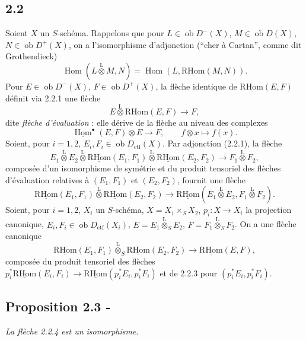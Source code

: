 \documentclass[11pt]{article}
\DeclareMathOperator{\Hom}{Hom}
\newcommand{\R}{\mathrm{R}}\newcommand{\RHomCore}{\mathrm{RHom}}
\newcommand{\ob}{\operatorname{ob}}
\providecommand{\RHom}{\RHomCore}
\providecommand{\uRHom}{\underline{\RHom}}
\providecommand{\ctf}{\mathrm{ctf}}
\providecommand{\RHom}{\RHomCore}
\providecommand{\Hom}{\operatorname{Hom}}
\providecommand{\ob}{\operatorname{ob}}
\providecommand{\RHom}{\R\mathcal{H}om}
\providecommand{\R}{\mathrm R}
\providecommand{\RHom}{\RHomCore}
\providecommand{\Hom}{\operatorname{Hom}}
\begin{document}
\subsection*{2.2}
Soient $X$ un $S$-schéma. Rappelons que pour $L\in\ob D^{-}(X)$, $M\in\ob D(X)$, $N\in\ob D^{+}(X)$, on a l'isomorphisme d'adjonction (``cher à Cartan'', comme dit Grothendieck)
\begin{equation}\tag{2.2.1}
\Hom(L\overset{\mathrm{L}}{\otimes}M,N)=\Hom(L,\uRHom(M,N)).
\end{equation}
Pour $E\in\ob D^{-}(X)$, $F\in\ob D^{+}(X)$, la flèche identique de $\uRHom(E,F)$ définit via 2.2.1 une flèche
\begin{equation}\tag{2.2.2}
E\overset{\mathrm{L}}{\otimes}\uRHom(E,F)\longrightarrow F,
\end{equation}
dite \emph{flèche d'évaluation} : elle dérive de la flèche au niveau des complexes
\[
\underline{\Hom}^{\bullet}(E,F)\otimes E\longrightarrow F,
\qquad f\otimes x\longmapsto f(x).
\]
Soient, pour $i=1,2$, $E_i,F_i\in\ob D_{\ctf}(X)$. Par adjonction (2.2.1), la flèche
\[
E_1\overset{\mathrm{L}}{\otimes}E_2\overset{\mathrm{L}}{\otimes}\uRHom(E_1,F_1)\overset{\mathrm{L}}{\otimes}\uRHom(E_2,F_2)\longrightarrow F_1\overset{\mathrm{L}}{\otimes}F_2,
\]
composée d'un isomorphisme de symétrie et du produit tensoriel des flèches d'évaluation relatives à $(E_1,F_1)$ et $(E_2,F_2)$, fournit une flèche
\begin{equation}\tag{2.2.3}
\uRHom(E_1,F_1)\overset{\mathrm{L}}{\otimes}\uRHom(E_2,F_2)\longrightarrow\uRHom(E_1\overset{\mathrm{L}}{\otimes}E_2,F_1\overset{\mathrm{L}}{\otimes}F_2).
\end{equation}
Soient, pour $i=1,2$, $X_i$ un $S$-schéma, $X=X_1\times_SX_2$, $p_i:X\to X_i$ la projection canonique, $E_i,F_i\in\ob D_{\ctf}(X_i)$, $E=E_1\overset{\mathrm{L}}{\otimes}_{S}E_2$, $F=F_1\overset{\mathrm{L}}{\otimes}_{S}F_2$. On a une flèche canonique
\begin{equation}\tag{2.2.4}
\uRHom(E_1,F_1)\overset{\mathrm{L}}{\otimes}_{S}\uRHom(E_2,F_2)\longrightarrow\uRHom(E,F),
\end{equation}
composée du produit tensoriel des flèches $p_i^{*}\uRHom(E_i,F_i)\to\uRHom(p_i^{*}E_i,p_i^{*}F_i)$ et de 2.2.3 pour $(p_i^{*}E_i,p_i^{*}F_i)$.

\subsection*{Proposition 2.3 -}
\emph{La flèche 2.2.4 est un isomorphisme}.
\end{document}
